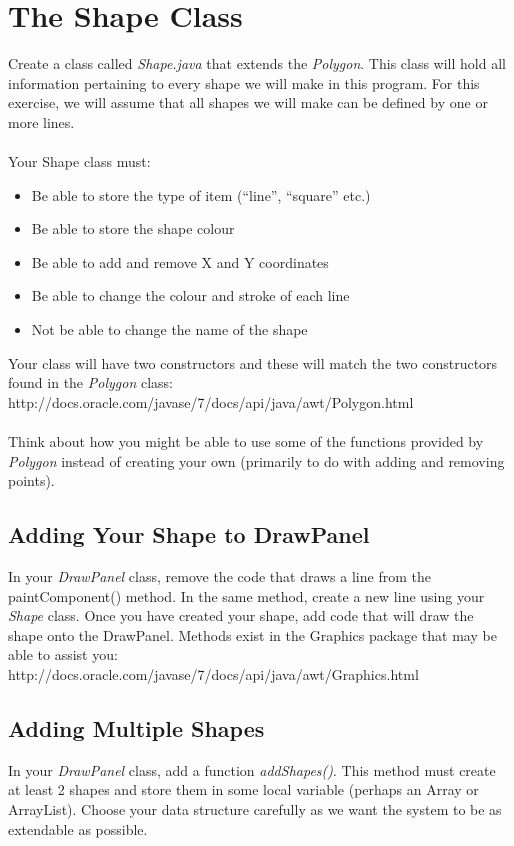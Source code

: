 \documentclass[a4paper,12pt]{article}
\begin{document}
\section{The Shape Class}
Create a class called \textit{Shape.java} that extends the \textit{Polygon}. This class will hold all information pertaining to every shape we will make in this program. For this exercise, we will assume that all shapes we will make can be defined by one or more lines.\\
\\
Your Shape class must:
\begin{itemize}
\item Be able to store the type of item (``line'', ``square'' etc.)
\item Be able to store the shape colour
\item Be able to add and remove X and Y coordinates
\item Be able to change the colour and stroke of each line
\item Not be able to change the name of the shape
\end{itemize}
Your class will have two constructors and these will match the two constructors found in the \textit{Polygon} class:\\

http://docs.oracle.com/javase/7/docs/api/java/awt/Polygon.html\\
\\
Think about how you might be able to use some of the functions provided by \textit{Polygon} instead of creating your own (primarily to do with adding and removing points).

\subsection{Adding Your Shape to DrawPanel}
In your \textit{DrawPanel} class, remove the code that draws a line from the paintComponent() method. In the same method, create a new line using your \textit{Shape} class. Once you have created your shape, add code that will draw the shape onto the DrawPanel. Methods exist in the Graphics package that may be able to assist you:\\

http://docs.oracle.com/javase/7/docs/api/java/awt/Graphics.html

\subsection{Adding Multiple Shapes}
In your \textit{DrawPanel} class, add a function \textit{addShapes()}. This method must create at least 2 shapes and store them in some local variable (perhaps an Array or ArrayList). Choose your data structure carefully as we want the system to be as extendable as possible.\\
\end{document}
